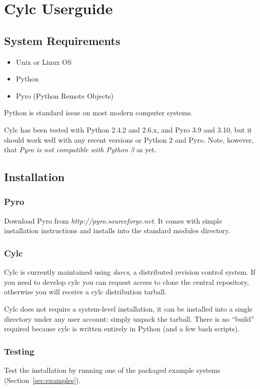 \documentclass[11pt,a4paper]{article}
\begin{document}
\section{Cylc Userguide}
\label{sec:usage}

\subsection{System Requirements}

\begin{itemize}
    \item Unix or Linux OS
    \item Python
    \item Pyro (Python Remote Objects)
\end{itemize}

Python is standard issue on most modern computer systems.

Cylc has been tested with Python 2.4.2 and 2.6.x, and Pyro 3.9 and 3.10, 
but it should work well with any recent versions or Python 2 and Pyro.
Note, however, that {\em Pyro is not compatible with Python 3} as yet.


\subsection{Installation}

\subsubsection{Pyro}
Download Pyro from {\em http://pyro.sourceforge.net}. It comes
with simple installation instructions and installs into the standard
modules directory.

\subsubsection{Cylc}
Cylc is currently maintained using {\em darcs}, a distributed revision
control system. If you need to develop cylc you can request access to
clone the central repository, otherwise you will receive a cylc
distribution tarball.

Cylc does not require a system-level installation, it can be installed
into a single directory under any user account: simply unpack the
tarball. There is no ``build'' required because cylc is written entirely 
in Python (and a few bash scripts).

\subsubsection{Testing}
Test the installation by running one of the packaged example systems
(Section~\ref{sec:examples}).
\end{document}
